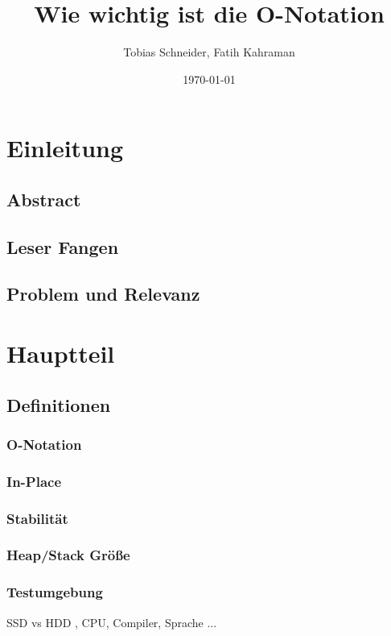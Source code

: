\documentclass{article}
\title{Wie wichtig ist die O-Notation}
\author{Tobias Schneider, Fatih Kahraman}
\date{\today}
\begin{document}
\maketitle %
\thispagestyle{empty} %
\newpage{}

\tableofcontents{}%
\setcounter{page}{1} %
\newpage{}


\section{Einleitung}
\subsection{Abstract}
\subsection{Leser Fangen}
\subsection{Problem und Relevanz}

\section{Hauptteil}
\subsection{Definitionen}
\subsubsection{O-Notation}
\subsubsection{In-Place}
\subsubsection{Stabilität}
\subsubsection{Heap/Stack Größe}
\subsubsection{Testumgebung}
SSD vs HDD , CPU, Compiler, Sprache ...
\end{document}
